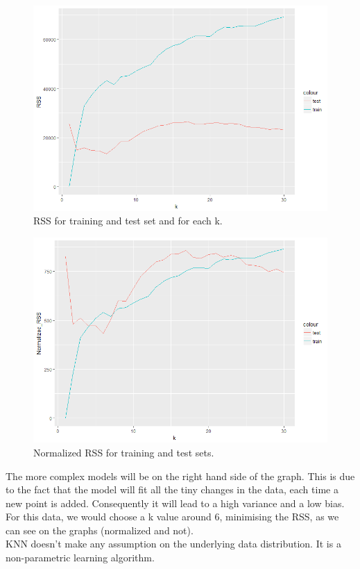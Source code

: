 \documentclass[11pt,a4paper,twoside,openright]{report}
\begin{document}
 
\begin{figure}[H]
	\centering
	\includegraphics[width=0.7\linewidth]{"img/RplotRSS"}
	\caption{RSS for training and test set and for each k.}
	\label{fig:rplotrss}
\end{figure}


\begin{figure}[H]
	\centering
	\includegraphics[width=0.7\linewidth]{"img/RplotRSSNormalized"}
	\caption{Normalized RSS for training and test sets.}
	\label{fig:rplotrssnormalized}
\end{figure}




The more complex models will be on the right hand side of the graph. This is due to the fact that the model will fit all the tiny changes in the data, each time a new point is added. Consequently it will lead to a high variance and a low bias. For this data, we would choose a k value around 6, minimising the RSS, as we can see on the graphs (normalized and not). \\

\noindent KNN doesn't make any assumption on the underlying data distribution. It is a non-parametric learning algorithm. 







	
	
\end{document}
